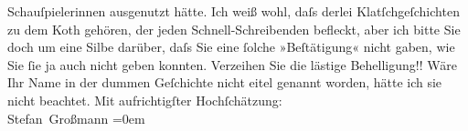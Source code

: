 \begin{ledgroupsized}[t]{13cm}
                    Schauſpielerinnen ausgenutzt hätte.\pend
           \pstart
           Ich weiß wohl, daſs derlei Klatſchgeſchichten zu dem Koth gehören, der jeden
                    Schnell-Schreibenden befleckt, aber ich bitte Sie doch um eine Silbe darüber,
                    daſs Sie eine ſolche »Beſtätigung« nicht gaben, wie Sie ſie ja auch nicht geben
                    konnten.\pend
           \pstart
           Verzeihen Sie die lästige Behelligung!! Wäre Ihr Name in der dummen Geſchichte
                    nicht eitel genannt worden, hätte ich sie nicht beachtet.\pend
           \pstart
           Mit aufrichtigſter Hochſchätzung:{\\[\baselineskip]}\spacefill\mbox{Stefan Großmann}\pend
           \leftskip=0em{}\endnumbering{}\end{ledgroupsized}  \newcommand{\dateiname}{L02005}\newcommand{\titel}{Stefan Großmann an Arthur Schnitzler, [7.] 2. 1911}\newcommand{\editorInnen}{Martin Anton Müller und Gerd-Hermann Susen}
      